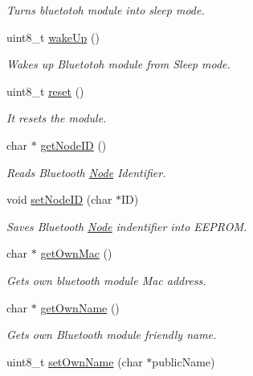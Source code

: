 \begin{DoxyCompactItemize}
\begin{DoxyCompactList}\small\item\em Turns bluetotoh module into sleep mode. \end{DoxyCompactList}\item 
uint8\+\_\+t \hyperlink{class_wasp_b_t___pro_a052614e1f3aa0d8d589bf9989e793d93}{wake\+Up} ()
\begin{DoxyCompactList}\small\item\em Wakes up Bluetotoh module from Sleep mode. \end{DoxyCompactList}\item 
uint8\+\_\+t \hyperlink{class_wasp_b_t___pro_abdda1f9a9e1b319de171e808c37d4462}{reset} ()
\begin{DoxyCompactList}\small\item\em It resets the module. \end{DoxyCompactList}\item 
char $\ast$ \hyperlink{class_wasp_b_t___pro_aaedf7f199f43e41b9c9926be8d4ef1d2}{get\+Node\+ID} ()
\begin{DoxyCompactList}\small\item\em Reads Bluetooth \hyperlink{struct_node}{Node} Identifier. \end{DoxyCompactList}\item 
void \hyperlink{class_wasp_b_t___pro_a43cbd39e9509fcc97b6acc0598669801}{set\+Node\+ID} (char $\ast$ID)
\begin{DoxyCompactList}\small\item\em Saves Bluetooth \hyperlink{struct_node}{Node} indentifier into E\+E\+P\+R\+OM. \end{DoxyCompactList}\item 
char $\ast$ \hyperlink{class_wasp_b_t___pro_accfe52843100a73b49bd8def8a91b29f}{get\+Own\+Mac} ()
\begin{DoxyCompactList}\small\item\em Gets own bluetooth module Mac address. \end{DoxyCompactList}\item 
char $\ast$ \hyperlink{class_wasp_b_t___pro_a50ec94e0c5a81483e3ff5881c0cade06}{get\+Own\+Name} ()
\begin{DoxyCompactList}\small\item\em Gets own Bluetooth module friendly name. \end{DoxyCompactList}\item 
uint8\+\_\+t \hyperlink{class_wasp_b_t___pro_a2703d774a0483a6afca4c050f5b5b292}{set\+Own\+Name} (char $\ast$public\+Name)

\end{DoxyCompactItemize}
